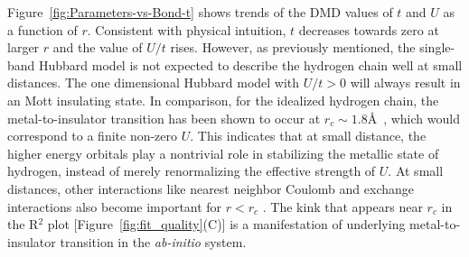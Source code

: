 Figure~\ref{fig:Parameters-vs-Bond-t} shows trends of the DMD values of $t$ and $U$ as a function of $r$. 
Consistent with physical intuition, $t$ decreases towards zero at larger $r$
and the value of $U/t$ rises. However, as previously mentioned, the single-band 
Hubbard model is not expected to describe the hydrogen chain well at small distances. 
The one dimensional Hubbard model with $U/t>0$ will always result in 
an Mott insulating state. In comparison, for the idealized hydrogen chain, the 
metal-to-insulator transition has been shown to occur at $r_c \sim 1.8$\AA~\cite{Stella2011}, which would correspond 
to a finite non-zero $U$. This indicates that at small distance, the higher energy orbitals play a nontrivial 
role in stabilizing the metallic state of hydrogen, instead of merely renormalizing the effective strength of $U$. 
At small distances, other interactions like nearest neighbor Coulomb 
and exchange interactions also become important for $r<r_c$ \cite{ZhengThesis}. The kink that appears near $r_c$ in the R$^2$ plot [Figure~\ref{fig:fit_quality}(C)] is a manifestation of underlying metal-to-insulator transition in the \textit{ab-initio} system. 
